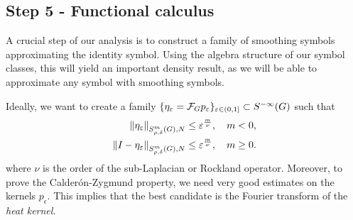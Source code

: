 \subsection*{Step 5 - Functional calculus}

A crucial step of our analysis is to construct a family of smoothing symbols approximating the identity symbol.
Using the algebra structure of our symbol classes,
this will yield an important density result,
as we will be able to approximate any symbol with smoothing symbols.

Ideally,
we want to create a family $\{\eta_\epsilon = \Fourier p_\epsilon\}_{\epsilon \in (0, 1]} \subset \SmoothingSymbols$
such that
\begin{align*}
    \SymbolSemiNorm m {\rho, \delta} N {\eta_\epsilon}
    &\leq \epsilon^\frac m \nu,
    \quad m < 0,\\
    \SymbolSemiNorm m {\rho, \delta} N {\Id {} - \eta_\epsilon}
    &\leq \epsilon^\frac m \nu,
    \quad m \geq 0.
\end{align*}
where $\nu$ is the order of the sub-Laplacian or Rockland operator.
Moreover,
to prove the Calder\'on-Zygmund property,
we need very good estimates on the kernels $p_\epsilon$.
This implies that the best candidate is the Fourier transform of the \emph{heat kernel}.

